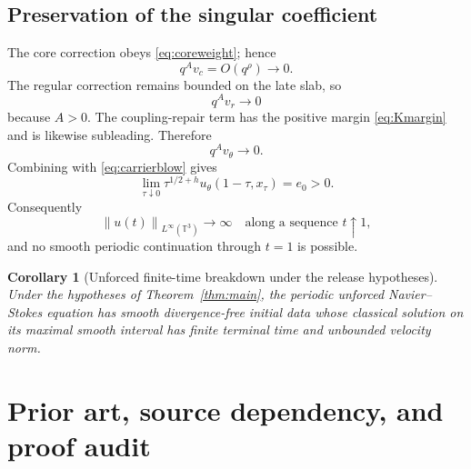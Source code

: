 \documentclass[11pt]{article}
\newtheorem{corollary}[theorem]{Corollary}
\numberwithin{equation}{section}
\newcommand{\T}{\mathbb T^3}
\newcommand{\norm}[1]{\left\lVert #1\right\rVert}
\begin{document}
\subsection{Preservation of the singular coefficient}
The core correction obeys \eqref{eq:coreweight}; hence
\begin{equation}
q^A v_c=O(q^\rho)\longrightarrow0.
\label{eq:coresub}
\end{equation}
The regular correction remains bounded on the late slab, so
\begin{equation}
q^A v_r\longrightarrow0
\label{eq:regsub}
\end{equation}
because \(A>0\).  The coupling-repair term has the positive margin \eqref{eq:Kmargin} and is likewise subleading.  Therefore
\begin{equation}
q^Av_\theta\longrightarrow0.
\label{eq:allsub}
\end{equation}
Combining with \eqref{eq:carrierblow} gives
\begin{equation}
\boxed{
\lim_{\tau\downarrow0}\tau^{1/2+h}u_\theta(1-\tau,x_\tau)=e_0>0.}
\label{eq:finalblow}
\end{equation}
Consequently
\begin{equation}
\norm{u(t)}_{L^\infty(\T)}\to\infty
\quad\text{along a sequence }t\uparrow1,
\label{eq:Linftyblow}
\end{equation}
and no smooth periodic continuation through \(t=1\) is possible.

\begin{corollary}[Unforced finite-time breakdown under the release hypotheses]
Under the hypotheses of Theorem~\ref{thm:main}, the periodic unforced Navier--Stokes equation has smooth divergence-free initial data whose classical solution on its maximal smooth interval has finite terminal time and unbounded velocity norm.
\end{corollary}

\section{Prior art, source dependency, and proof audit}\label{sec:audit}
\end{document}
